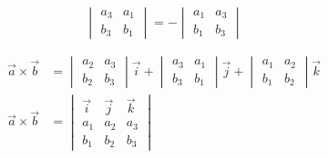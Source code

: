 \[
\begin{vmatrix}
a_3 & a_1\\
b_3 & b_1
\end{vmatrix}
= -
\begin{vmatrix}
a_1 & a_3 \\
b_1 & b_3
\end{vmatrix}
\]

\begin{align*}
	\vec{a} \times \vec{b} &= 
	\begin{vmatrix}
	a_2 & a_3\\
	b_2 & b_3
	\end{vmatrix}
	\vec{i} +
	\begin{vmatrix}
	a_3 & a_1 \\
	b_3 & b_1
	\end{vmatrix}
	\vec{j} +
	\begin{vmatrix}
	a_1 & a_2 \\
	b_1 & b_2
	\end{vmatrix}
	\vec{k}\\
	\vec{a} \times \vec{b} &=
	\begin{vmatrix}
	\vec{i} & \vec{j} & \vec{k}\\
	a_1 & a_2 & a_3 \\
	b_1 & b_2 & b_3
	\end{vmatrix}
\end{align*}
